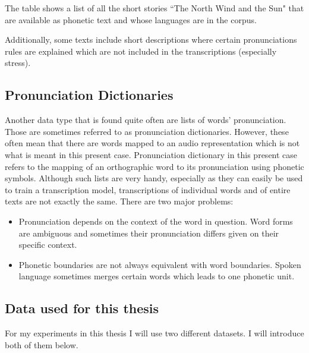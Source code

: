 \begin{table}[h!]
\begin{center}
\caption[The North Wind and the Sun]{The table shows a list of all the short stories ``The North Wind and the Sun" that are available as phonetic text and whose languages are in the corpus.}
\label{north-wind-stories}
\end{center}
\end{table}



Additionally, some texts include short descriptions where certain pronunciations rules are explained which are not included in the transcriptions (especially stress). 

\subsection{Pronunciation Dictionaries}
Another data type that is found quite often are lists of words' pronunciation. Those are sometimes referred to as pronunciation dictionaries. However, these often mean that there are words mapped to an audio representation which is not what is meant in this present case. Pronunciation dictionary in this present case refers to the mapping of an orthographic word to its pronunciation using phonetic symbols. Although such lists are very handy, especially as they can easily be used to train a transcription model, transcriptions of individual words and of entire texts are not exactly the same. There are two major problems:

\begin{itemize}
\item Pronunciation depends on the context of the word in question. Word forms are ambiguous and sometimes their pronunciation differs given on their specific context.  
\item Phonetic boundaries are not always equivalent with word boundaries. Spoken language sometimes merges certain words which leads to one phonetic unit. 
\end{itemize} 

\subsection{Data used for this thesis}
For my experiments in this thesis I will use two different datasets. I will introduce both of them below. 

